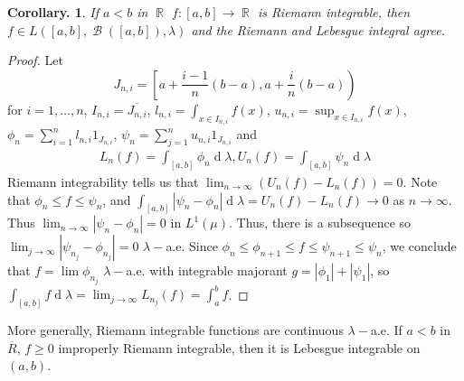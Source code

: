 \documentclass[11pt, a4paper]{memoir}
\DeclareMathOperator{\R}{{\mathbb{R}}}
\newcommand{\ol}[1]{\ensuremath{\overline{#1}}}
\theoremstyle{change}
\newtheorem{corollary}[theorem]{Corollary.}
\theoremstyle{plain}
\theoremstyle{nonumberplain}
\newtheorem{proof}{Proof}
\DeclareMathOperator{\B}{{\mathcal{B}}}
\renewcommand{\d}[1]{\ensuremath{\operatorname{d}\!{#1}}}
\numberwithin{equation}{section}
\begin{document}
\begin{corollary}
    If $a<b$ in $\R$ $f:[a,b]\to\R$ is Riemann integrable, then $f\in L([a,b],\B([a,b]),\lambda)$ and the Riemann and Lebesgue integral agree.
\end{corollary}
\begin{proof}
    Let
    \begin{equation*}
        J_{n,i}=\left[a+\frac{i-1}{n}(b-a),a+\frac{i}{n}(b-a)\right)
    \end{equation*}
    for $i=1,\ldots,n$, $I_{n,i}=\ol{J_{n,i}}$, $l_{n,i}=\int_{x\in I_{n,i}}f(x)$, $u_{n,i}=\sup_{x\in I_{n,i}}f(x)$, $\phi_n=\sum_{i=1}^n l_{n,i}1_{J_{n,i}}$, $\psi_n=\sum_{j=1}^n u_{n,i}1_{J_{n,i}}$ and
    \begin{align*}
        L_n(f)=\int_{[a,b]}\phi_n\d{\lambda},U_n(f)=\int_{[a,b]}\psi_n\d{\lambda}
    \end{align*}
    Riemann integrability tells us that $\lim_{n\to\infty}(U_n(f)-L_n(f))=0$.
    Note that $\phi_n\leq f\leq\psi_n$, and $\int_{[a,b]}|\psi_n-\phi_n|\d{\lambda}=U_n(f)-L_n(f)\to 0$ as $n\to\infty$.
    Thus $\lim_{n\to\infty}|\psi_n-\phi_n|=0$ in $L^1(\mu)$.
    Thus, there is a subsequence so $\lim_{j\to\infty}|\psi_{n_j}-\phi_{n_j}|=0$ $\lambda-$a.e.
    Since $\phi_n\leq\phi_{n+1}\leq f\leq\psi_{n+1}\leq\psi_n$, we conclude that $f=\lim\phi_{n_j}$ $\lambda-$a.e. with integrable majorant $g=|\phi_1|+|\psi_1|$, so $\int_{[a,b]}f\d{\lambda}=\lim_{j\to\infty}L_{n_j}(f)=\int_a^b f$.
\end{proof}
More generally, Riemann integrable functions are continuous $\lambda-$a.e.
If $a<b$ in $\ol{R}$, $f\geq 0$ improperly Riemann integrable, then it is Lebesgue integrable on $(a,b)$.
\end{document}
